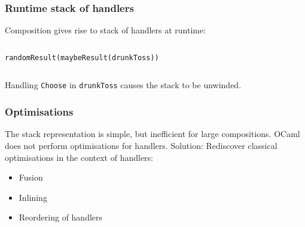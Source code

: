 \documentclass[10pt,compress]{beamer}
\begin{document}
\begin{frame}[fragile]
  \frametitle{Runtime stack of handlers}
  Composition gives rise to stack of handlers at runtime:
\vfill
\begin{columns}
\begin{column}{0.5\textwidth}
\lstinline$randomResult(maybeResult(drunkToss))$
\end{column}
\begin{column}{0.5\textwidth}
\end{column}
\end{columns}
\vfill
Handling \lstinline$Choose$ in \lstinline$drunkToss$ causes the stack to be unwinded.
\end{frame}

\begin{frame}
  \frametitle{Optimisations}
  The stack representation is simple, but inefficient for large compositions.
  OCaml does not perform optimisations for handlers.
\vfill
  Solution: Rediscover classical optimisations in the context of handlers:
  \begin{itemize}
    \item Fusion
    \item Inlining
    \item Reordering of handlers
  \end{itemize}
\end{frame}
\end{document}
